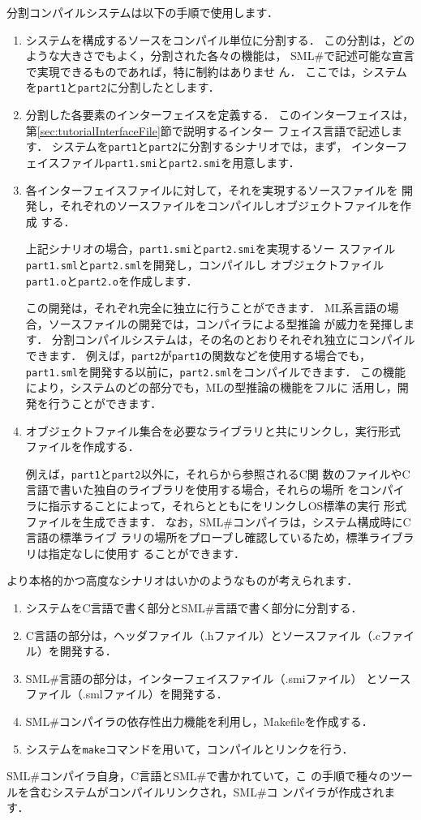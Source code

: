 \documentclass{jbook}
\newcommand{\smlsharp}{SML\#}
\begin{document}
	分割コンパイルシステムは以下の手順で使用します．
\begin{enumerate}
\item システムを構成するソースをコンパイル単位に分割する．
	この分割は，どのような大きさでもよく，分割された各々の機能は，
\smlsharp{}で記述可能な宣言で実現できるものであれば，特に制約はありませ
ん．
	ここでは，システムを{\tt part1}と{\tt part2}に分割したとします．
\item 分割した各要素のインターフェイスを定義する．
	このインターフェイスは，第\ref{sec:tutorialInterfaceFile}節で説明するインター
フェイス言語で記述します．
	システムを{\tt part1}と{\tt part2}に分割するシナリオでは，まず，
インターフェイスファイル{\tt part1.smi}と{\tt part2.smi}を用意します．
\item 各インターフェイスファイルに対して，それを実現するソースファイルを
開発し，それぞれのソースファイルをコンパイルしオブジェクトファイルを作成
する．

	上記シナリオの場合，{\tt part1.smi}と{\tt part2.smi}を実現するソー
スファイル{\tt part1.sml}と{\tt part2.sml}を開発し，コンパイルし
オブジェクトファイル{\tt part1.o}と{\tt part2.o}を作成します．

	この開発は，それぞれ完全に独立に行うことができます．
	ML系言語の場合，ソースファイルの開発では，コンパイラによる型推論
が威力を発揮します．
	分割コンパイルシステムは，その名のとおりそれぞれ独立にコンパイル
できます．
	例えば，{\tt part2}が{\tt part1}の関数などを使用する場合でも，
{\tt part1.sml}を開発する以前に，{\tt part2.sml}をコンパイルできます．
	この機能により，システムのどの部分でも，MLの型推論の機能をフルに
活用し，開発を行うことができます．
\item オブジェクトファイル集合を必要なライブラリと共にリンクし，実行形式
ファイルを作成する．

	例えば，{\tt part1}と{\tt part2}以外に，それらから参照されるC関
数のファイルやC言語で書いた独自のライブラリを使用する場合，それらの場所
をコンパイラに指示することによって，それらとともにをリンクしOS標準の実行
形式ファイルを生成できます．
	なお，\smlsharp{}コンパイラは，システム構成時にC言語の標準ライブ
ラリの場所をプローブし確認しているため，標準ライブラリは指定なしに使用す
ることができます．
\end{enumerate}
	より本格的かつ高度なシナリオはいかのようなものが考えられます．
\begin{enumerate}
\item システムをC言語で書く部分と\smlsharp{}言語で書く部分に分割する．
\item C言語の部分は，ヘッダファイル（.hファイル）とソースファイル（.cファイル）を開発する．
\item \smlsharp{}言語の部分は，インターフェイスファイル（.smiファイル）
とソースファイル（.smlファイル）を開発する．
\item \smlsharp{}コンパイラの依存性出力機能を利用し，Makefileを作成する．
\item システムを{\tt make}コマンドを用いて，コンパイルとリンクを行う．
\end{enumerate}
	\smlsharp{}コンパイラ自身，C言語と\smlsharp{}で書かれていて，こ
の手順で種々のツールを含むシステムがコンパイルリンクされ，\smlsharp{}コ
ンパイラが作成されます．
\end{document}
